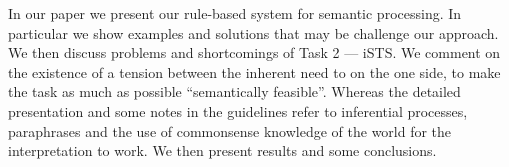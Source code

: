 In our paper we present our rule-based system for semantic processing. In particular we show examples and solutions that may be challenge our approach. We then discuss problems and shortcomings of Task 2 --- iSTS. We comment on the existence of a tension between the inherent need to on the one side, to make the task as much as possible ``semantically feasible''. Whereas the detailed presentation and some notes in the guidelines refer to inferential processes, paraphrases and the use of commonsense knowledge of the world for the interpretation to work. We then present results and some conclusions.
